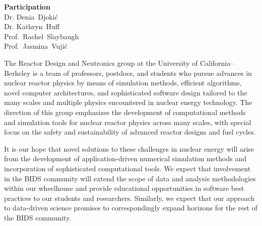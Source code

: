 \documentclass[a4paper, 10pt]{article}
\newcommand{\authorname}{Reactor Design and Neutronics Group}
\newcommand{\longauthorname}{Dr. Denia~Djoki\'{c}\\Dr.  Kathryn~Huff\\Prof.~Rachel~Slaybaugh\\Prof.~Jasmina~Vuji\'{c} }
\newcommand{\authorsite}{ucb-rdn.github.com}
\begin{document}
\pagestyle{fancy}
\lhead{\textcolor{gray}{\it \authorname}}
\rhead{\textcolor{gray}{\thepage/\totalpages{}}}
\renewcommand{\headrulewidth}{0pt} 
\renewcommand{\footrulewidth}{0pt} 
\fancyfoot[C]{\footnotesize \textcolor{gray}{\authorsite}} 

\begin{center}
{\LARGE \bf Participation}\\
\vspace*{0.1cm}
{\normalsize \longauthorname}
\end{center}




The Reactor Design and Neutronics group at the University of 
California--Berkeley \cite{reactor_design_and_neutronics_university_2013} is a team of professors, 
postdocs, and students who pursue advances in nuclear reactor physics by means of 
simulation methods, efficient algorithms, novel computer architectures, and 
sophisticated software design tailored to the many scales and multiple physics 
encountered in nuclear energy technology.  The direction of this group 
emphasizes the development of computational methods and simulation tools for 
nuclear reactor physics across many scales, with special focus on the safety and 
sustainability of advanced reactor designs and fuel cycles.  

It is our hope that novel solutions to these challenges in nuclear 
energy will arise from the development of application-driven numerical 
simulation methods and incorporation of sophisticated computational tools.  
We expect that involvement in the BIDS community will extend the 
scope of data and analysis methodologies within our wheelhouse and provide 
educational opportunities in software best practices to our students and 
researchers. Similarly, we expect that our approach to data-driven science 
promises to correspondingly expand horizons for the rest of the BIDS community.
\end{document}
